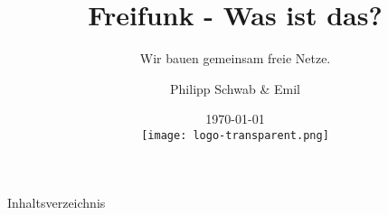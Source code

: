 \documentclass{beamer}
\begin{document}
\title[Freifunk]{Freifunk - Was ist das?}
\subtitle[Offene Netze]{Wir bauen gemeinsam freie Netze.}
\author{Philipp Schwab \& Emil}
\date{\today\\\vspace{0.5cm} \texttt{[image: logo-transparent.png]}}

\begin{frame}
\titlepage	
\end{frame}
\begin{frame}{Inhaltsverzeichnis}
	\tableofcontents
\end{frame}




\end{document}
